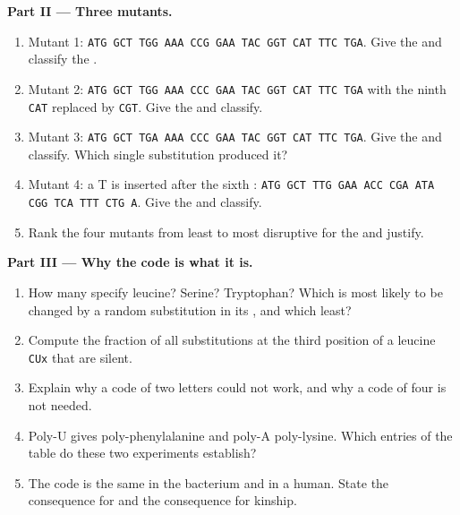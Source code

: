\begin{problem}
\medskip
\noindent\textbf{Part II --- Three mutants.}
\begin{enumerate}[resume]
  \item Mutant 1: \texttt{ATG GCT TGG AAA CCG GAA TAC GGT CAT TTC TGA}.
        Give the  and classify the .
  \item Mutant 2: \texttt{ATG GCT TGG AAA CCC GAA TAC GGT CAT TTC TGA}
        with the ninth  \texttt{CAT} replaced by \texttt{CGT}.
        Give the  and classify.
  \item Mutant 3: \texttt{ATG GCT TGA AAA CCC GAA TAC GGT CAT TTC TGA}.
        Give the  and classify. Which single substitution
        produced it?
  \item Mutant 4: a T is inserted after the sixth :
        \texttt{ATG GCT TTG GAA ACC CGA ATA CGG TCA TTT CTG A}. Give
        the  and classify.
  \item Rank the four mutants from least to most disruptive for the
         and justify.
\end{enumerate}

\medskip
\noindent\textbf{Part III --- Why the code is what it is.}
\begin{enumerate}[resume]
  \item How many  specify leucine? Serine? Tryptophan? Which
         is most likely to be changed by a random
        substitution in its , and which least?
  \item Compute the fraction of all substitutions at the third
        position of a leucine  \texttt{CUx} that are silent.
  \item Explain why a code of two letters could not work, and why a
        code of four is not needed.
  \item Poly-U gives poly-phenylalanine and poly-A poly-lysine. Which
        entries of the table do these two experiments establish?
  \item The code is the same in the bacterium and in a human. State
        the consequence for  and the consequence for
        kinship.
\end{enumerate}


\end{problem}
